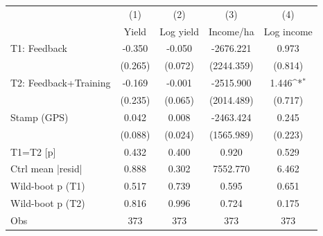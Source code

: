{
\def\sym#1{\ifmmode^{#1}\else\(^{#1}\)\fi}
\begin{tabular}{l*{4}{c}}
\toprule
                    &\multicolumn{1}{c}{(1)}&\multicolumn{1}{c}{(2)}&\multicolumn{1}{c}{(3)}&\multicolumn{1}{c}{(4)}\\
                    &\multicolumn{1}{c}{Yield}&\multicolumn{1}{c}{Log yield}&\multicolumn{1}{c}{Income/ha}&\multicolumn{1}{c}{Log income}\\
\midrule
T1: Feedback        &      -0.350         &      -0.050         &   -2676.221         &       0.973         \\
                    &     (0.265)         &     (0.072)         &  (2244.359)         &     (0.814)         \\
T2: Feedback+Training&      -0.169         &      -0.001         &   -2515.900         &       1.446\sym{*}  \\
                    &     (0.235)         &     (0.065)         &  (2014.489)         &     (0.717)         \\
Stamp (GPS)         &       0.042         &       0.008         &   -2463.424         &       0.245         \\
                    &     (0.088)         &     (0.024)         &  (1565.989)         &     (0.223)         \\
\midrule
T1=T2 [p]           &       0.432         &       0.400         &       0.920         &       0.529         \\
Ctrl mean |resid|   &       0.888         &       0.302         &    7552.770         &       6.462         \\
Wild-boot p (T1)    &       0.517         &       0.739         &       0.595         &       0.651         \\
Wild-boot p (T2)    &       0.816         &       0.996         &       0.724         &       0.175         \\
Obs                 &         373         &         373         &         373         &         373         \\
\bottomrule
\end{tabular}
}
